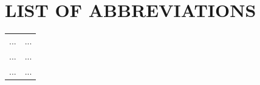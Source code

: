 
\chapter*{LIST OF ABBREVIATIONS}

\begin{longtable}{@{}p{2.8cm}p{12.2cm}@{}}
... & ... \\
... & ... \\
... & ... \\
\end{longtable}

